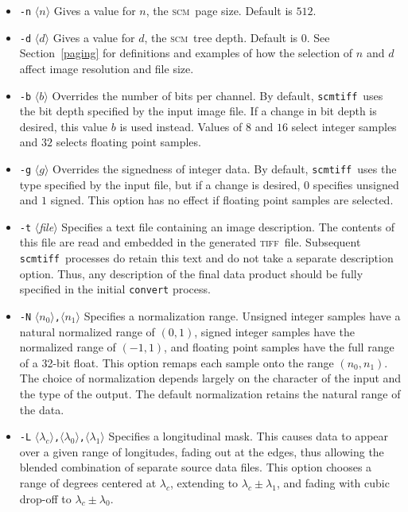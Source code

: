 \documentclass[oneside,10pt]{memoir}
\newcommand{\scm}     {\textsc{scm}}
\newcommand{\tiff}    {\textsc{tiff}}
\newcommand{\scmtiff} {\texttt{scmtiff}}
\newcommand{\inangles}[1]{$\langle$#1$\rangle$}
\newenvironment{optionlist}
  {\setlength{\leftmargini}{1in}\begin{itemize}}{\end{itemize}}
\begin{document}
\begin{Spacing}{1.1}
\begin{optionlist}
\item[\texttt{-n} \inangles{$n$}] Gives a value for $n$, the \scm\ page size. Default is $512$.

\item[\texttt{-d} \inangles{$d$}] Gives a value for $d$, the \scm\ tree depth. Default is $0$. See Section~\ref{paging} for definitions and examples of how the selection of $n$ and $d$ affect image resolution and file size.

\item[\texttt{-b} \inangles{$b$}] Overrides the number of bits per channel. By default, \scmtiff\ uses the bit depth specified by the input image file. If a change in bit depth is desired, this value $b$ is used instead. Values of $8$ and $16$ select integer samples and $32$ selects floating point samples.

\item[\texttt{-g} \inangles{$g$}] Overrides the signedness of integer data. By default, \scmtiff\ uses the type specified by the input file, but if a change is desired, $0$ specifies unsigned and $1$ signed. This option has no effect if floating point samples are selected.

\item[\texttt{-t} \inangles{\textit{file}}] Specifies a text file containing an image description. The contents of this file are read and embedded in the generated \tiff\ file. Subsequent \scmtiff\ processes do retain this text and do not take a separate description option. Thus, any description of the final data product should be fully specified in the initial \texttt{convert} process.

\item[\texttt{-N} \inangles{$n_0$}\texttt{,}\inangles{$n_1$}] Specifies a normalization range. Unsigned integer samples have a natural normalized range of $(0, 1)$, signed integer samples have the normalized range of $(-1,1)$, and floating point samples have the full range of a 32-bit float. This option remaps each sample onto the range $(n_0,n_1)$. The choice of normalization depends largely on the character of the input and the type of the output. The default normalization retains the natural range of the data.

\item[\texttt{-L} \inangles{$\lambda_c$}\texttt{,}\inangles{$\lambda_0$}\texttt{,}\inangles{$\lambda_1$}] Specifies a longitudinal mask. This causes data to appear over a given range of longitudes, fading out at the edges, thus allowing the blended combination of separate source data files. This option chooses a range of degrees centered at $\lambda_c$, extending to $\lambda_c\pm\lambda_1$, and fading with cubic drop-off to $\lambda_c\pm\lambda_0$.


\end{optionlist}
\end{Spacing}
\end{document}
